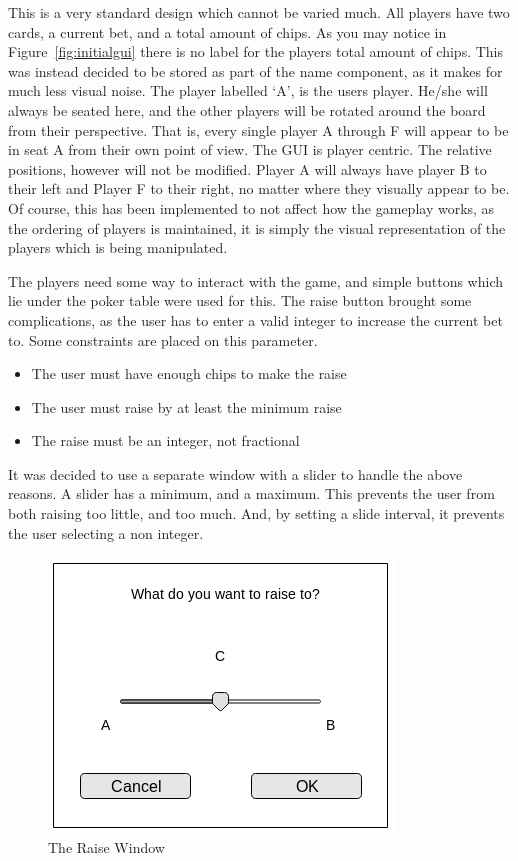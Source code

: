 This is a very standard design which cannot be varied much. All players have
two cards, a current bet, and a total amount of chips. As you may notice
in Figure~\ref{fig:initialgui} there is no label for the players total amount
of chips. This was instead decided to be stored as part of the name component,
as it makes for much less visual noise. The player labelled `A', is the
users player. He/she will always be seated here, and the other players will
be rotated around the board from their perspective. That is, every single
player A through F will appear to be in seat A from their own point of view.
The GUI is player centric. The relative positions, however will not be 
modified. Player A will always have player B to their left and Player F to 
their right, no matter where they visually appear to be. Of course, this has 
been implemented to not affect how the gameplay works, as the ordering of 
players is maintained, it is simply the visual representation of the players 
which is being manipulated.

The players need some way to interact with the game, and simple buttons which 
lie under the poker table were used for this. The raise button brought some 
complications, as the user has to enter a valid integer to increase the current
bet to. Some constraints are placed on this parameter.

\newpage

\begin{itemize}
\item The user must have enough chips to make the raise
\item The user must raise by at least the minimum raise
\item The raise must be an integer, not fractional
\end{itemize}

It was decided to use a separate window with a slider to handle the above
reasons. A slider has a minimum, and a maximum. This prevents the user from
both raising too little, and too much. And, by setting a slide interval, it
prevents the user selecting a non integer.

\begin{figure}[h]
    \centering
    \includegraphics[width=0.5\linewidth]{../images/raisewindow.png}
    \caption{The Raise Window}%
    \label{fig:raisewindow}
\end{figure}

